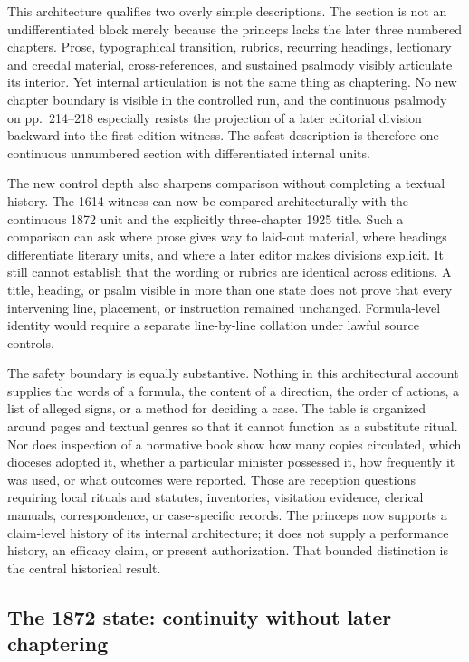 This architecture qualifies two overly simple descriptions. The section is
not an undifferentiated block merely because the princeps lacks the later
three numbered chapters. Prose, typographical transition, rubrics, recurring
headings, lectionary and creedal material, cross-references, and sustained
psalmody visibly articulate its interior. Yet internal articulation is not
the same thing as chaptering. No new chapter boundary is visible in the
controlled run, and the continuous psalmody on pp.~214--218 especially
resists the projection of a later editorial division backward into the
first-edition witness. The safest description is therefore one continuous
unnumbered section with differentiated internal units.

The new control depth also sharpens comparison without completing a textual
history. The 1614 witness can now be compared architecturally with the
continuous 1872 unit and the explicitly three-chapter 1925 title. Such a
comparison can ask where prose gives way to laid-out material, where headings
differentiate literary units, and where a later editor makes divisions
explicit. It still cannot establish that the wording or rubrics are identical
across editions. A title, heading, or psalm visible in more than one state
does not prove that every intervening line, placement, or instruction
remained unchanged. Formula-level identity would require a separate
line-by-line collation under lawful source controls.

The safety boundary is equally substantive. Nothing in this architectural
account supplies the words of a formula, the content of a direction, the
order of actions, a list of alleged signs, or a method for deciding a case.
The table is organized around pages and textual genres so that it cannot
function as a substitute ritual. Nor does inspection of a normative book
show how many copies circulated, which dioceses adopted it, whether a
particular minister possessed it, how frequently it was used, or what
outcomes were reported. Those are reception questions requiring local
rituals and statutes, inventories, visitation evidence, clerical manuals,
correspondence, or case-specific records. The princeps now supports a
claim-level history of its internal architecture; it does not supply a
performance history, an efficacy claim, or present authorization.
That bounded distinction is the central historical result.

\subsection{The 1872 state: continuity without later chaptering}

